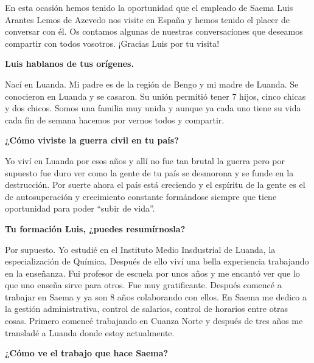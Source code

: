 \cappar En esta ocasión hemos tenido la oportunidad que el empleado de
Saema Luis Arantes Lemos de Azevedo nos visite en España y hemos
tenido el placer de conversar con él.  Os contamos algunas de nuestras
conversaciones que deseamos compartir con todos vosotros. ¡Gracias
Luis por tu visita!
\vspace{2cm}

{\bf Luis hablanos de tus orígenes.}


\vspace{10pt}

Nací en Luanda. Mi padre es de la región de Bengo y mi madre de
Luanda. Se conocieron en Luanda y se casaron. Su unión permitió tener
7 hijos, cinco chicas y dos chicos. Somos una familia muy unida y
aunque ya cada uno tiene su vida cada fin de semana hacemos por vernos
todos y compartir.

\vspace{10pt}

{\bf ¿Cómo viviste la guerra civil en tu país?}

\vspace{10pt}

Yo viví en Luanda por esos años y allí no fue tan brutal la guerra
pero por supuesto fue duro ver como la gente de tu país se desmorona y
se funde en la destrucción. Por suerte ahora el país está creciendo y
el espíritu de la gente es el de autosuperación y crecimiento
constante formándose siempre que tiene oportunidad para poder ``subir
de vida''.

\vspace{10pt}

{\bf Tu formación Luis, ¿puedes resumírnosla?}

\vspace{10pt}

Por supuesto. Yo estudié en el Instituto Medio Insdustrial de Luanda,
la especialización de Química. Después de ello viví una bella
experiencia trabajando en la enseñanza. Fui profesor de escuela por
unos años y me encantó ver que lo que uno enseña sirve para otros. Fue
muy gratificante. Después comencé a trabajar en Saema y ya son 8 años
colaborando con ellos. En Saema me dedico a la gestión administrativa,
control de salarios, control de horarios entre otras cosas. Primero
comencé trabajando en Cuanza Norte y después de tres años me transladé
a Luanda donde estoy actualmente.

\vspace{10pt}

{\bf ¿Cómo ve el trabajo que hace Saema?}

